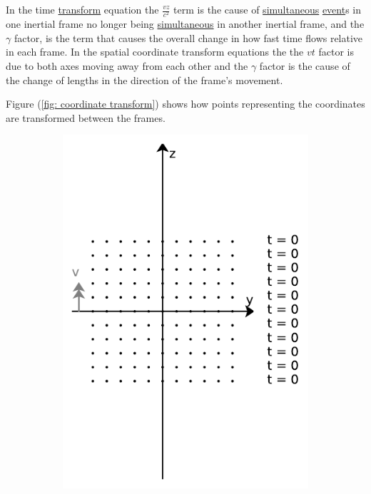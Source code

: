 In the time \hyperlink{def-transform}{transform} equation the $\frac{{v}{z}}{{c}^2}$ term is the cause of \hyperlink{def-simultaneity}{simultaneous} \hyperlink{def-event}{event}s in one inertial frame no longer being \hyperlink{def-simultaneity}{simultaneous} in another inertial frame, and the ${\gamma}$ factor, is the term that causes the overall change in how fast time flows relative in each frame.
In the spatial coordinate transform equations the the ${v}{t}$ factor is due to both axes moving away from each other and the ${\gamma}$ factor is the cause of the change of lengths in the direction of the frame's movement.

Figure (\ref{fig: coordinate transform}) shows how points representing the coordinates are transformed between the frames.

\begin{figure}[H]
	\centering
	\begin{subfigure}{0.29\textwidth}
		\centering
		\includegraphics[width=\textwidth]{images/pdf/coord_transform_initial.pdf}

\end{subfigure}
\end{figure}
